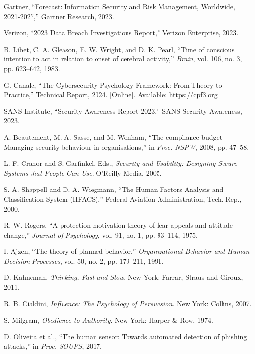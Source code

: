 \documentclass[10pt,twocolumn]{IEEEtran}
\begin{document}
\begin{thebibliography}{99}

Gartner, ``Forecast: Information Security and Risk Management, Worldwide, 2021-2027,'' Gartner Research, 2023.

Verizon, ``2023 Data Breach Investigations Report,'' Verizon Enterprise, 2023.

B. Libet, C. A. Gleason, E. W. Wright, and D. K. Pearl, ``Time of conscious intention to act in relation to onset of cerebral activity,'' \emph{Brain}, vol. 106, no. 3, pp. 623--642, 1983.

G. Canale, ``The Cybersecurity Psychology Framework: From Theory to Practice,'' Technical Report, 2024. [Online]. Available: https://cpf3.org

SANS Institute, ``Security Awareness Report 2023,'' SANS Security Awareness, 2023.

A. Beautement, M. A. Sasse, and M. Wonham, ``The compliance budget: Managing security behaviour in organisations,'' in \emph{Proc. NSPW}, 2008, pp. 47--58.

L. F. Cranor and S. Garfinkel, Eds., \emph{Security and Usability: Designing Secure Systems that People Can Use}. O'Reilly Media, 2005.

S. A. Shappell and D. A. Wiegmann, ``The Human Factors Analysis and Classification System (HFACS),'' Federal Aviation Administration, Tech. Rep., 2000.

R. W. Rogers, ``A protection motivation theory of fear appeals and attitude change,'' \emph{Journal of Psychology}, vol. 91, no. 1, pp. 93--114, 1975.

I. Ajzen, ``The theory of planned behavior,'' \emph{Organizational Behavior and Human Decision Processes}, vol. 50, no. 2, pp. 179--211, 1991.

D. Kahneman, \emph{Thinking, Fast and Slow}. New York: Farrar, Straus and Giroux, 2011.

R. B. Cialdini, \emph{Influence: The Psychology of Persuasion}. New York: Collins, 2007.

S. Milgram, \emph{Obedience to Authority}. New York: Harper \& Row, 1974.

D. Oliveira et al., ``The human sensor: Towards automated detection of phishing attacks,'' in \emph{Proc. SOUPS}, 2017.


\end{thebibliography}
\end{document}

